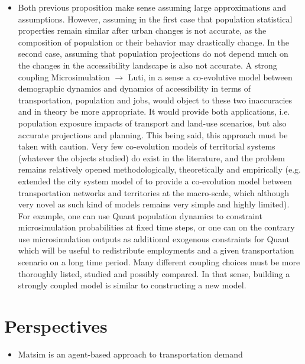 \begin{itemize}
	\item Both previous proposition make sense assuming large approximations and assumptions. However, assuming in the first case that population statistical properties remain similar after urban changes is not accurate, as the composition of population or their behavior may drastically change. In the second case, assuming that population projections do not depend much on the changes in the accessibility landscape is also not accurate. A strong coupling Microsimulation $\rightarrow$ Luti, in a sense a co-evolutive model between  demographic dynamics and dynamics of accessibility in terms of transportation, population and jobs, would object to these two inaccuracies and in theory be more appropriate. It would provide both applications, i.e. population exposure impacts of transport and land-use scenarios, but also accurate projections and planning. This being said, this approach must be taken with caution. Very few co-evolution models of territorial systems (whatever the objects studied) do exist in the literature, and the problem remains relatively opened methodologically, theoretically and empirically (e.g. \cite{raimbault2018modeling} extended the city system model of \cite{raimbault2018indirect} to provide a co-evolution model between transportation networks and territories at the macro-scale, which although very novel as such kind of models remains very simple and highly limited). For example, one can use Quant population dynamics to constraint microsimulation probabilities at fixed time steps, or one can on the contrary use microsimulation outputs as additional exogenous constraints for Quant which will be useful to redistribute employments and a given transportation scenario on a long time period. Many different coupling choices must be more thoroughly listed, studied and possibly compared. In that sense, building a strongly coupled model is similar to constructing a new model.
\end{itemize}


\section{Perspectives}


\begin{itemize}
	\item Matsim is an agent-based approach to transportation demand \cite{horni2016multi}
\end{itemize}











